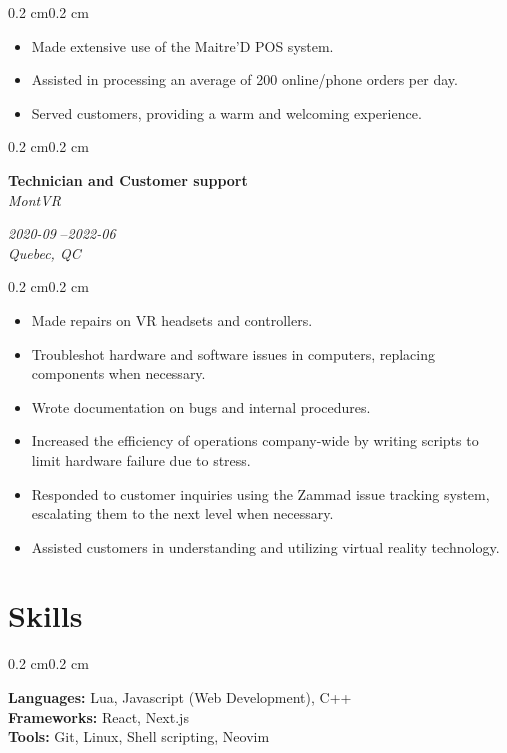 \documentclass[10pt, letterpaper]{article}
\newenvironment{highlights}{%
    \begin{itemize}[
        topsep=0.10 cm,%
        parsep=0.10 cm,%
        partopsep=0pt,%
        itemsep=0pt,%
        leftmargin=0.4 cm + 10pt%
    ]
}{%
    \end{itemize}%
}
\newenvironment{onecolentry}{%
    \begin{adjustwidth}{0.2 cm}{0.2 cm}%
}{%
    \end{adjustwidth}%
}
\newenvironment{twocolentry}[1]{%
    \begin{onecolentry}%
    \def\twocolentryarg{#1}%
    \noindent
    \begin{minipage}[t]{0.68\textwidth} %
}{%
    \end{minipage}\hfill%
    \begin{minipage}[t]{0.30\textwidth} %
      \raggedleft\twocolentryarg
    \end{minipage}%
    \vspace{0.2cm}%
    \end{onecolentry}%
}
\begin{document}
\vspace{0.10 cm}
\begin{onecolentry}
    \begin{highlights}
        \item Made extensive use of the Maitre'D POS system.
        \item Assisted in processing an average of 200 online/phone orders per day.
        \item Served customers, providing a warm and welcoming experience.
    \end{highlights}
\end{onecolentry}
\vspace{0.2 cm}
\begin{twocolentry}{%
\textit{2020-09 }--\textit{2022-06} \\[0.1cm]
\textit{Quebec, QC}%
}
    \textbf{Technician and Customer support }\\
    \textit{MontVR }
\end{twocolentry}
\vspace{0.10 cm}
\begin{onecolentry}
    \begin{highlights}
        \item Made repairs on VR headsets and controllers.
        \item Troubleshot hardware and software issues in computers, replacing components when necessary.
        \item Wrote documentation on bugs and internal procedures.
        \item Increased the efficiency of operations company-wide by writing scripts to limit hardware failure due to stress.
        \item Responded to customer inquiries using the Zammad issue tracking system, escalating them to the next level when necessary.
        \item Assisted customers in understanding and utilizing virtual reality technology.
    \end{highlights}
\end{onecolentry}
\vspace{0.2 cm}


\section{Skills}
\begin{onecolentry}
    \textbf{Languages:} Lua, Javascript (Web Development), C++\\
    \textbf{Frameworks:} React, Next.js\\
    \textbf{Tools:} Git, Linux, Shell scripting, Neovim\\
\end{onecolentry}
\end{document}
